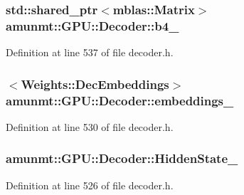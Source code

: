 \subsubsection[{\texorpdfstring{b4\+\_\+}{b4_}}]{\setlength{\rightskip}{0pt plus 5cm}std\+::shared\+\_\+ptr$<${\bf mblas\+::\+Matrix}$>$ amunmt\+::\+G\+P\+U\+::\+Decoder\+::b4\+\_\+\hspace{0.3cm}{\ttfamily [private]}}\hypertarget{classamunmt_1_1GPU_1_1Decoder_a06b3ce95fed30df283a7044a8b95961d}{}\label{classamunmt_1_1GPU_1_1Decoder_a06b3ce95fed30df283a7044a8b95961d}


Definition at line 537 of file decoder.\+h.

\subsubsection[{\texorpdfstring{embeddings\+\_\+}{embeddings_}}]{$<${\bf Weights\+::\+Dec\+Embeddings}$>$ amunmt\+::\+G\+P\+U\+::\+Decoder\+::embeddings\+\_\+\hspace{0.3cm}{\ttfamily [private]}}\hypertarget{classamunmt_1_1GPU_1_1Decoder_a05262f3f89bc3aec8cb5dbd4e695dbb7}{}\label{classamunmt_1_1GPU_1_1Decoder_a05262f3f89bc3aec8cb5dbd4e695dbb7}


Definition at line 530 of file decoder.\+h.

\subsubsection[{\texorpdfstring{Hidden\+State\+\_\+}{HiddenState_}}]{ amunmt\+::\+G\+P\+U\+::\+Decoder\+::\+Hidden\+State\+\_\+\hspace{0.3cm}{\ttfamily [private]}}\hypertarget{classamunmt_1_1GPU_1_1Decoder_a7dde6f55a406e5029deefadb4ec4e721}{}\label{classamunmt_1_1GPU_1_1Decoder_a7dde6f55a406e5029deefadb4ec4e721}


Definition at line 526 of file decoder.\+h.

